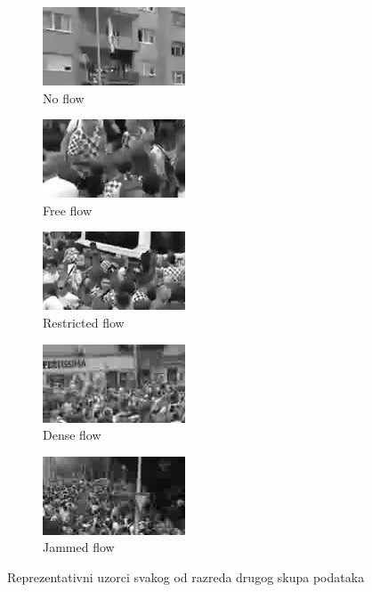 \documentclass[times, utf8, zavrsni, numeric]{fer}
\begin{document}
\begin{figure}[ht]
	\begin{subfigure}[b]{0.19\linewidth}
		\centering
		\includegraphics[scale=0.4]{img/noflow2.jpg}
		\caption{No flow}
	\end{subfigure}
	\begin{subfigure}[b]{0.19\linewidth}
		\centering
		\includegraphics[scale=0.4]{img/freeflow2.jpg}
		\caption{Free flow}
	\end{subfigure}
	\begin{subfigure}[b]{0.19\linewidth}
		\centering
		\includegraphics[scale=0.4]{img/restrictedflow2.jpg}
		\caption{Restricted flow}
	\end{subfigure}
	\begin{subfigure}[b]{0.19\linewidth}
		\centering
		\includegraphics[scale=0.4]{img/denseflow2.jpg}
		\caption{Dense flow}
	\end{subfigure}
	\begin{subfigure}[b]{0.19\linewidth}
		\centering
		\includegraphics[scale=0.4]{img/jammedflow2.jpg}
		\caption{Jammed flow}
	\end{subfigure}
\caption{Reprezentativni uzorci svakog od razreda drugog skupa podataka}
\end{figure}
\end{document}
